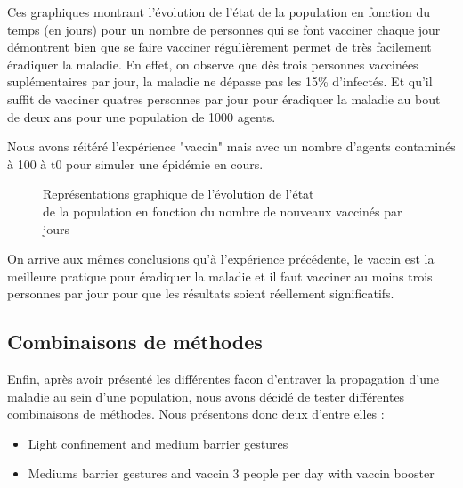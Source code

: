 \documentclass[a4paper, 12pt]{report}
\begin{document}
Ces graphiques montrant l'évolution de l'état de la population en fonction du temps (en jours) pour un nombre de personnes qui se font vacciner chaque jour démontrent bien que
se faire vacciner régulièrement permet de très facilement éradiquer la maladie. En effet, on observe que dès trois personnes vaccinées suplémentaires par jour, la maladie ne dépasse pas les 15\% d'infectés.
Et qu'il suffit de vacciner quatres personnes par jour pour éradiquer la maladie au bout de deux ans pour une population de 1000 agents.

\newpage

Nous avons réitéré l'expérience "vaccin" mais avec un nombre d'agents contaminés à 100 à t0 pour simuler une épidémie en cours.

\begin{figure}[h]
	\centering
	\qquad
	\centering
	\qquad
	\caption{Représentations graphique de l'évolution de l'état\\ de la population en fonction du nombre de nouveaux vaccinés par jours}

\end{figure}

On arrive aux mêmes conclusions qu'à l'expérience précédente, le vaccin est la meilleure pratique pour éradiquer la maladie et il faut vacciner au moins trois personnes par jour pour
que les résultats soient réellement significatifs.

\newpage

\subsection{Combinaisons de méthodes}

Enfin, après avoir présenté les différentes facon d'entraver la propagation d'une maladie au sein d'une population, nous avons décidé de tester différentes combinaisons de méthodes.
Nous présentons donc deux d'entre elles :

\begin{itemize}
	\item Light confinement and medium barrier gestures
	\item Mediums barrier gestures and vaccin 3 people per day with vaccin booster
\end{itemize}
\end{document}

